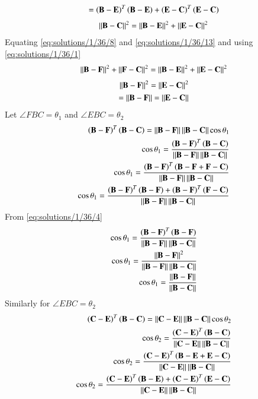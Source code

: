     \begin{align}
      =\left(\mathbf{B}-\mathbf{E}\right)^T\left(\mathbf{B}-\mathbf{E}\right)+\left(\mathbf{E}-\mathbf{C}\right)^T\left(\mathbf{E}-\mathbf{C}\right) 
    \end{align}
\begin{align}
   \left\lVert\mathbf{B}-\mathbf{C}\right\rVert^2=\left\lVert\mathbf{B}-\mathbf{E}\right\rVert^2+\left\lVert\mathbf{E}-\mathbf{C}\right\rVert^2\label{eq:solutions/1/36/13}
    \end{align}        
    Equating \eqref{eq:solutions/1/36/8} and \eqref{eq:solutions/1/36/13} and using \eqref{eq:solutions/1/36/1}
    \begin{align}
      \left\lVert\mathbf{B}-\mathbf{F}\right\rVert^2+\left\lVert\mathbf{F}-\mathbf{C}\right\rVert^2 = \left\lVert\mathbf{B}-\mathbf{E}\right\rVert^2+\left\lVert\mathbf{E}-\mathbf{C}\right\rVert^2  
    \end{align}
    \begin{align}
       \left\lVert\mathbf{B}-\mathbf{F}\right\rVert^2=\left\lVert\mathbf{E}-\mathbf{C}\right\rVert^2\\
       =\left\lVert\mathbf{B}-\mathbf{F}\right\rVert=\left\lVert\mathbf{E}-\mathbf{C}\right\rVert\label{eq:solutions/1/36/16}
    \end{align}
Let $\angle FBC=\theta_1$  and  $\angle EBC=\theta_2$
    \begin{align}
        \left(\mathbf{B}-\mathbf{F}\right)^T\left(\mathbf{B}-\mathbf{C}\right)=\left\lVert\mathbf{B}-\mathbf{F}\right\rVert\left\lVert\mathbf{B}-\mathbf{C}\right\rVert\cos\theta_1\\
        \cos{\theta_1}=\frac{\left(\mathbf{B}-\mathbf{F}\right)^T\left(\mathbf{B}-\mathbf{C}\right)}{\left\lVert\mathbf{B}-\mathbf{F}\right\rVert\left\lVert\mathbf{B}-\mathbf{C}\right\rVert}\\
        \cos{\theta_1}=\frac{\left(\mathbf{B}-\mathbf{F}\right)^T\left(\mathbf{B}-\mathbf{F}+\mathbf{F}-\mathbf{C}\right)}{\left\lVert\mathbf{B}-\mathbf{F}\right\rVert\left\lVert\mathbf{B}-\mathbf{C}\right\rVert}\\
        \cos{\theta_1}=\frac{\left(\mathbf{B}-\mathbf{F}\right)^T\left(\mathbf{B}-\mathbf{F}\right) +\left(\mathbf{B}-\mathbf{F}\right)^T\left(\mathbf{F}-\mathbf{C}\right)}{\left\lVert\mathbf{B}-\mathbf{F}\right\rVert\left\lVert\mathbf{B}-\mathbf{C}\right\rVert}
        \end{align}
        From \eqref{eq:solutions/1/36/4}
        \begin{align}
          \cos{\theta_1}=\frac{\left(\mathbf{B}-\mathbf{F}\right)^T\left(\mathbf{B}-\mathbf{F}\right)}{\left\lVert\mathbf{B}-\mathbf{F}\right\rVert\left\lVert\mathbf{B}-\mathbf{C}\right\rVert} \\
          \cos{\theta_1}=\frac{\left\lVert\mathbf{B}-\mathbf{F}\right\rVert^2}{\left\lVert\mathbf{B}-\mathbf{F}\right\rVert\left\lVert\mathbf{B}-\mathbf{C}\right\rVert}\\
          \cos{\theta_1}=\frac{\left\lVert\mathbf{B}-\mathbf{F}\right\rVert}{\left\lVert\mathbf{B}-\mathbf{C}\right\rVert}
        \end{align}
        Similarly for $\angle EBC=\theta_2$
       \begin{align}
        \left(\mathbf{C}-\mathbf{E}\right)^T\left(\mathbf{B}-\mathbf{C}\right)=\left\lVert\mathbf{C}-\mathbf{E}\right\rVert\left\lVert\mathbf{B}-\mathbf{C}\right\rVert\cos\theta_2\\
        \cos{\theta_2}=\frac{\left(\mathbf{C}-\mathbf{E}\right)^T\left(\mathbf{B}-\mathbf{C}\right)}{\left\lVert\mathbf{C}-\mathbf{E}\right\rVert\left\lVert\mathbf{B}-\mathbf{C}\right\rVert}\\
        \cos{\theta_2}=\frac{\left(\mathbf{C}-\mathbf{E}\right)^T\left(\mathbf{B}-\mathbf{E}+\mathbf{E}-\mathbf{C}\right)}{\left\lVert\mathbf{C}-\mathbf{E}\right\rVert\left\lVert\mathbf{B}-\mathbf{C}\right\rVert}\\
        \cos{\theta_2}=\frac{\left(\mathbf{C}-\mathbf{E}\right)^T\left(\mathbf{B}-\mathbf{E}\right) +\left(\mathbf{C}-\mathbf{E}\right)^T\left(\mathbf{E}-\mathbf{C}\right)}{\left\lVert\mathbf{C}-\mathbf{E}\right\rVert\left\lVert\mathbf{B}-\mathbf{C}\right\rVert}
        \end{align}
